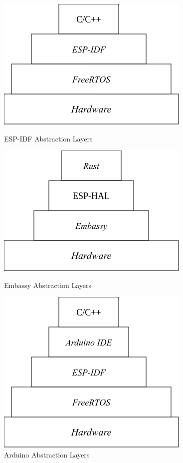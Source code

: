 \begin{figure}[!htb]
    \centering
    \begin{minipage}{0.49\textwidth}
        \centering
        \includegraphics[scale=0.4]{images/introduction/idf_layers}
        \caption{ESP-IDF Abstraction Layers}
        \label{fig:idf_layers}
      \end{minipage}  
    \begin{minipage}{0.49\textwidth}
        \centering
        \includegraphics[scale=0.4]{images/introduction/rust_layers}
        \caption{Embassy Abstraction Layers}
        \label{fig:rust_layers}
      \end{minipage}  
    \begin{minipage}{0.49\textwidth}
      \centering
        \vspace{0.5cm}
        \includegraphics[scale=0.4]{images/introduction/arduino_layers}
        \caption{Arduino Abstraction Layers}
        \label{fig:arduino_layers}
    \end{minipage}%
\end{figure}



